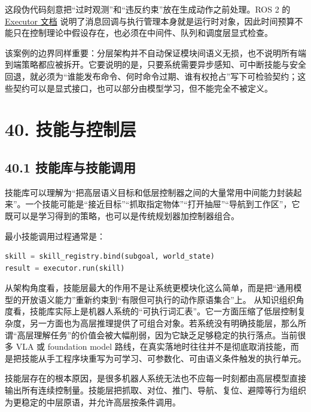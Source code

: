 这段伪代码刻意把“过时观测”和“违反约束”放在生成动作之前处理。ROS 2 的 \href{https://docs.ros.org/en/ros2_documentation/rolling/Concepts/Intermediate/About-Executors.html}{Executor 文档} 说明了消息回调与执行管理本身就是运行时对象，因此时间预算不能只在控制理论中假设存在，也必须在中间件、队列和调度层显式检查。

该案例的边界同样重要：分层架构并不自动保证模块间语义无损，也不说明所有端到端策略都应被拆开。它要说明的是，只要系统需要异步感知、可中断技能与安全回退，就必须为“谁能发布命令、何时命令过期、谁有权抢占”写下可检验契约；这些契约可以是显式接口，也可以部分由模型学习，但不能完全不被定义。

\section*{40. 技能与控制层}

\subsection*{40.1 技能库与技能调用}


技能库可以理解为“把高层语义目标和低层控制器之间的大量常用中间能力封装起来”。一个技能可能是“接近目标”“抓取指定物体”“打开抽屉”“导航到工作区”，它既可以是学习得到的策略，也可以是传统规划器加控制器组合。

最小技能调用过程通常是：

\begin{lstlisting}[language=python]
skill = skill_registry.bind(subgoal, world_state)
result = executor.run(skill)
\end{lstlisting}

从架构角度看，技能层最大的作用不是让系统更模块化这么简单，而是把“通用模型的开放语义能力”重新约束到“有限但可执行的动作原语集合”上。 从知识组织角度看，技能库实际上是机器人系统的“可执行词汇表”。它一方面压缩了低层控制复杂度，另一方面也为高层推理提供了可组合对象。若系统没有明确技能层，那么所谓“高层理解任务”的价值会被大幅削弱，因为它缺乏足够稳定的执行落点。当前很多 VLA 或 foundation model 路线，在真实落地时往往并不是彻底取消技能，而是把技能从手工程序块重写为可学习、可参数化、可由语义条件触发的执行单元。

技能层存在的根本原因，是很多机器人系统无法也不应每一时刻都由高层模型直接输出所有连续控制量。技能层把抓取、对位、推门、导航、复位、避障等行为组织为更稳定的中层原语，并允许高层按条件调用。

